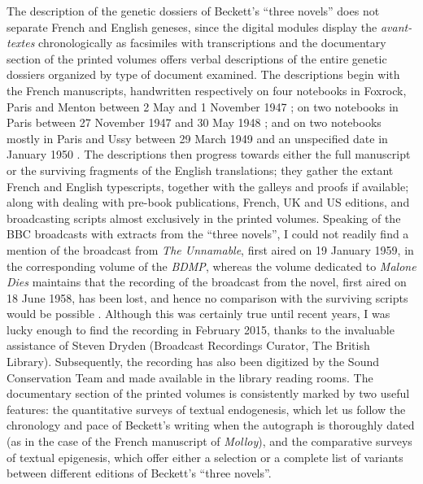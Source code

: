 \begin{paper}
The description of the genetic dossiers of Beckett's ``three novels''
does not separate French and English geneses, since the digital modules
display the \emph{avant-textes} chronologically as facsimiles with
transcriptions and the documentary section of the printed volumes offers
verbal descriptions of the entire genetic dossiers organized by type of
document examined. The descriptions begin with the French manuscripts,
handwritten respectively on four notebooks in Foxrock, Paris and Menton
between 2 May and 1 November 1947 \citep[33, 37--38, 47 and 51]{oreilly_making_2017}; on two notebooks in Paris between 27 November 1947 and 30 May
1948 \citep[47--48]{van_hulle_making_2017}; and on two notebooks mostly
in Paris and Ussy between 29 March 1949 and an unspecified date in
January 1950 \citep[32--33]{van_hulle_making_2014}. The descriptions then
progress towards either the full manuscript or the surviving fragments
of the English translations; they gather the extant French and English
typescripts, together with the galleys and proofs if available; along with dealing
with pre-book publications, French, UK and US editions, and broadcasting
scripts almost exclusively in the printed volumes. Speaking of the BBC
broadcasts with extracts from the ``three novels'', I could not readily
find a mention of the broadcast from \emph{The Unnamable}, first aired on
19 January 1959, in the corresponding volume of the \emph{BDMP}, whereas
the volume dedicated to \emph{Malone Dies} maintains that the recording
of the broadcast from the novel, first aired on 18 June 1958, has been
lost, and hence no comparison with the surviving scripts would be possible \citep[108 and 116]{van_hulle_making_2017}. Although this was certainly
true until recent years, I was lucky enough to find the recording in
February 2015, thanks to the invaluable assistance of Steven Dryden
(Broadcast Recordings Curator, The British Library). Subsequently,
the recording has also been digitized by the Sound Conservation Team and
made available in the library reading rooms. The documentary section of
the printed volumes is consistently marked by two useful features: the
quantitative surveys of textual endogenesis, which let us follow the
chronology and pace of Beckett's writing when the autograph is
thoroughly dated (as in the case of the French manuscript of
\emph{Molloy}), and the comparative surveys of textual epigenesis, which
offer either a selection or a complete list of variants between
different editions of Beckett's ``three novels''.


\end{paper}
